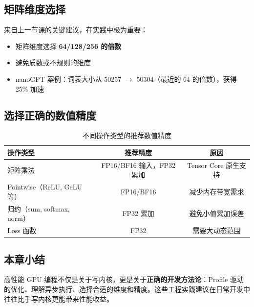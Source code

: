 \subsection{矩阵维度选择}

来自上一节课的关键建议，在实践中极为重要：
\begin{itemize}
    \item 矩阵维度选择 \textbf{64/128/256 的倍数}
    \item 避免质数或不规则的维度
    \item nanoGPT 案例：词表大小从 50257 $\rightarrow$ 50304（最近的 64 的倍数），获得 25\% 加速
\end{itemize}

\subsection{选择正确的数值精度}

\begin{table}[H]
\centering
\begin{tabular}{lcc}
\toprule
\textbf{操作类型} & \textbf{推荐精度} & \textbf{原因} \\
\midrule
矩阵乘法 & FP16/BF16 输入，FP32 累加 & Tensor Core 原生支持 \\
Pointwise（ReLU, GeLU 等） & FP16/BF16 & 减少内存带宽需求 \\
归约（sum, softmax, norm） & FP32 累加 & 避免小值累加误差 \\
Loss 函数 & FP32 & 需要大动态范围 \\
\bottomrule
\end{tabular}
\caption{不同操作类型的推荐数值精度}
\end{table}

\subsection{本章小结}

高性能 GPU 编程不仅是关于写内核，更是关于\textbf{正确的开发方法论}：Profile 驱动的优化、理解异步执行、选择合适的维度和精度。这些工程实践建议在日常开发中往往比手写内核更能带来性能收益。



